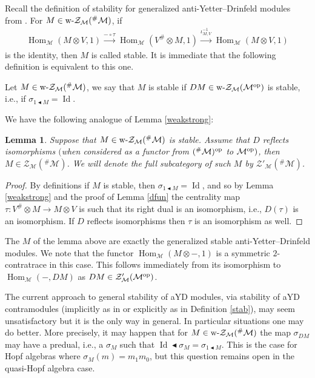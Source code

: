 \documentclass[pdftex]{sigma}
\newcommand{\Zc}{\mathcal{Z}}
\newcommand{\rab}{\blacktriangleleft}
\def\ot{\otimes}
\numberwithin{equation}{section}
\newtheorem{Lemma}[Theorem]{Lemma}
 { \theoremstyle{definition}
\newtheorem{Definition}[Theorem]{Definition}
\newtheorem{Remark}[Theorem]{Remark} }
\begin{document}
 Recall the definition of stability for generalized anti-Yetter--Drinfeld modules from \cite{hks}. For $M\in\text{\rm w-}\Zc_{\mathcal{M}}({^{\#}\mathcal{M}})$, if \begin{gather*}
 \operatorname{Hom}_\mathcal{M}(M\otimes V,1) \xrightarrow{-\circ\tau} \operatorname{Hom}_\mathcal{M}(V^\# \otimes M,1) \xrightarrow{\iota^{-1}_{M,V}} \operatorname{Hom}_\mathcal{M}(M\otimes V,1)
 \end{gather*}
 is the identity, then $M$ is called stable. It is immediate that the following definition is equivalent to this one.

 \begin{Definition}\label{stab}
Let $M\in\text{\rm w-}\Zc_{\mathcal{M}}({^{\#}\mathcal{M}})$, we say that $M$ is stable if $DM\in\text{\rm w-}\Zc_{\mathcal{M}}(\mathcal{M}^{\rm op})$ is stable, i.e., if $\sigma_{1\rab M}=\operatorname{Id}$.
 \end{Definition}

 We have the following analogue of Lemma \ref{weakstrong}:

\begin{Lemma}Suppose that $M\in\text{\rm w-}\Zc_{\mathcal{M}}({^{\#}\mathcal{M}})$ is stable. Assume that $D$ reflects isomorphisms $($when considered as a functor from $({^{\#}\mathcal{M}})^{\rm op}$ to $\mathcal{M}^{\rm op})$, then $M\in\Zc_{\mathcal{M}}({^{\#}\mathcal{M}})$. We will denote the full subcategory of such $M$ by $\Zc'_{\mathcal{M}}({^{\#}\mathcal{M}})$.
 \end{Lemma}
\begin{proof}By definitions if $M$ is stable, then $\sigma_{1\rab M}=\operatorname{Id}$, and so by Lemma \ref{weakstrong} and the proof of Lemma \ref{dfun} the centrality map $\tau\colon V^{\#}\ot M\to M\ot V$ is such that its right dual is an isomorphism, i.e., $D(\tau)$ is an isomorphism. If $D$ reflects isomorphisms then $\tau$ is an isomorphism as well.
\end{proof}

The $M$ of the lemma above are exactly the generalized stable anti-Yetter--Drinfeld modules. We note that the functor $\operatorname{Hom}_\mathcal{M}(M\ot-,1)$ is a symmetric $2$-contratrace in this case. This follows immediately from its isomorphism to $\operatorname{Hom}_\mathcal{M}(-,DM)$ as $DM\in\Zc_{\mathcal{M}}'(\mathcal{M}^{\rm op})$.

 \begin{Remark}\label{sigmadef}
The current approach to general stability of aYD modules, via stability of aYD contramodules (implicitly as in \cite{hks} or explicitly as in Definition \ref{stab}), may seem unsatisfactory but it is the only way in general. In particular situations one may do better. More precisely, it may happen that for $M\in\text{\rm w-}\Zc_{\mathcal{M}}({^{\#}\mathcal{M}})$ the map $\sigma_{DM}$ may have a predual, i.e., a $\sigma_M$ such that $\operatorname{Id}\rab\sigma_M=\sigma_{1\rab M}$. This is the case for Hopf algebras where $\sigma_M(m)=m_{1}m_{0}$, but this question remains open in the quasi-Hopf algebra case.
 \end{Remark}
\end{document}
